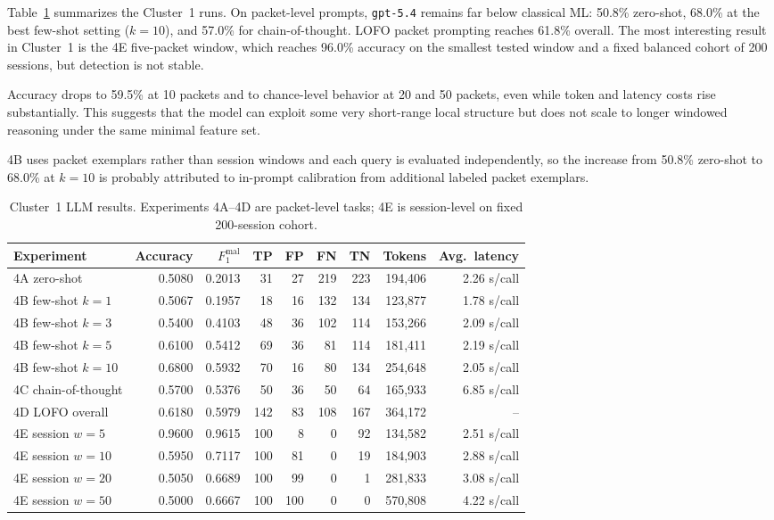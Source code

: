 \documentclass[conference]{IEEEtran}
\begin{document}
Table~\ref{tab:strict-llm} summarizes the Cluster~1 runs. On packet-level prompts, \texttt{gpt-5.4} remains far below classical ML: 50.8\% zero-shot, 68.0\% at the best few-shot setting ($k=10$), and 57.0\% for chain-of-thought. LOFO packet prompting reaches 61.8\% overall. The most interesting result in Cluster~1 is the 4E five-packet window, which reaches 96.0\% accuracy on  the smallest tested window and a fixed balanced cohort of 200 sessions, but detection is not stable. 

Accuracy drops to 59.5\% at 10 packets and to chance-level behavior at 20 and 50 packets, even while token and latency costs rise substantially. This suggests that the model can exploit some very short-range local structure but does not scale to longer windowed reasoning under the same minimal feature set.

4B uses packet exemplars rather than session windows and each query is evaluated independently, so the increase from 50.8\% zero-shot to 68.0\% at $k=10$ is probably attributed to in-prompt calibration from additional labeled packet exemplars.

\begin{table}[t]
\centering
\caption{Cluster~1 LLM results. Experiments 4A--4D are packet-level tasks; 4E is session-level on fixed 200-session cohort.}
\label{tab:strict-llm}
\footnotesize
\begin{tabular}{lrrrrrrrr}
\toprule
Experiment & Accuracy & $F_1^{\mathrm{mal}}$ & TP & FP & FN & TN & Tokens & Avg.\ latency \\
\midrule
4A zero-shot   & 0.5080 & 0.2013 & 31  & 27  & 219 & 223 & 194{,}406 & 2.26 s/call \\
4B few-shot $k=1$  & 0.5067 & 0.1957 & 18  & 16  & 132 & 134 & 123{,}877 & 1.78 s/call \\
4B few-shot $k=3$  & 0.5400 & 0.4103 & 48  & 36  & 102 & 114 & 153{,}266 & 2.09 s/call \\
4B few-shot $k=5$  & 0.6100 & 0.5412 & 69  & 36  & 81  & 114 & 181{,}411 & 2.19 s/call \\
4B few-shot $k=10$ & 0.6800 & 0.5932 & 70  & 16  & 80  & 134 & 254{,}648 & 2.05 s/call \\
4C chain-of-thought & 0.5700 & 0.5376 & 50  & 36  & 50  & 64  & 165{,}933 & 6.85 s/call \\
4D LOFO overall  & 0.6180 & 0.5979 & 142 & 83  & 108 & 167 & 364{,}172 & -- \\
4E session $w=5$  & 0.9600 & 0.9615 & 100 & 8   & 0   & 92  & 134{,}582 & 2.51 s/call \\
4E session $w=10$ & 0.5950 & 0.7117 & 100 & 81  & 0   & 19  & 184{,}903 & 2.88 s/call \\
4E session $w=20$ & 0.5050 & 0.6689 & 100 & 99  & 0   & 1   & 281{,}833 & 3.08 s/call \\
4E session $w=50$ & 0.5000 & 0.6667 & 100 & 100 & 0   & 0   & 570{,}808 & 4.22 s/call \\
\bottomrule
\end{tabular}
\end{table}
\end{document}
